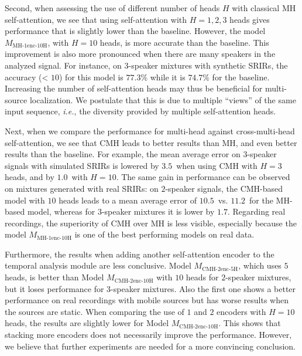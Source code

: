 Second, when assessing the use of different number of heads $H$ with classical MH self-attention, we see that using self-attention with $H=1,2,3$ heads gives performance that is slightly lower than the baseline. However, the model $M_{\text{MH-}1\text{enc-}10\text{H}}$, with $H=10$ heads, is more accurate than the baseline. This improvement is also more pronounced when there are many speakers in the analyzed signal. For instance, on $3$-speaker mixtures with synthetic SRIRs, the accuracy (< $10$\textdegree) for this model is $77.3$\% while it is $74.7$\% for the baseline. Increasing the number of self-attention heads may thus be beneficial for multi-source localization. We postulate that this is due to multiple ``views'' of the same input sequence, \emph{i.e.}, the diversity provided by multiple self-attention heads.

Next, when we compare the performance for multi-head against cross-multi-head self-attention, we see that CMH leads to better results than MH, and even better results than the baseline. For example, the mean average error on $3$-speaker signals with simulated SRIRs is lowered by $3.5$\textdegree~when using CMH with $H=3$ heads, and by $1.0$\textdegree~with $H=10$. The same gain in performance can be observed on mixtures generated with real SRIRs: on $2$-speaker signals, the CMH-based model with $10$ heads leads to a mean average error of $10.5$\textdegree~vs. $11.2$\textdegree~for the MH-based model, whereas for $3$-speaker mixtures it is lower by $1.7$\textdegree. Regarding real recordings, the superiority of CMH over MH is less visible, especially because the model $M_{\text{MH-}1\text{enc-}10\text{H}}$ is one of the best performing models on real data.

Furthermore, the results when adding another self-attention encoder to the temporal analysis module are less conclusive. Model $M_{\text{CMH-}2\text{enc-}5\text{H}}$, which uses $5$ heads, is better than Model $M_{\text{CMH-}2\text{enc-}10\text{H}}$ with $10$ heads for $2$-speaker mixtures, but it loses performance for $3$-speaker mixtures. Also the first one shows a better performance on real recordings with mobile sources but has worse results when the sources are static. When comparing the use of $1$ and $2$ encoders with $H=10$ heads, the results are slightly lower for Model $M_{\text{CMH-}2\text{enc-}10\text{H}}$. This shows that stacking more encoders does not necessarily improve the performance. However, we believe that further experiments are needed for a more convincing conclusion.


